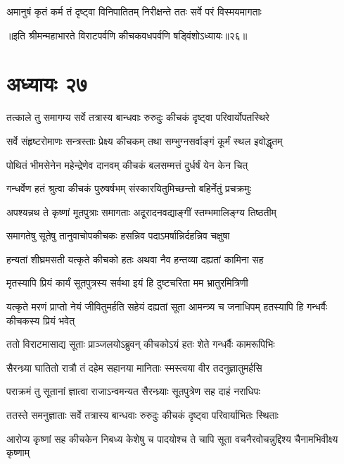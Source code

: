 \twolineshloka
{अमानुषं कृतं कर्म तं दृष्ट्वा विनिपातितम्}
{निरीक्षन्ते ततः सर्वे परं विस्मयमागताः}

॥इति श्रीमन्महाभारते विराटपर्वणि कीचकवधपर्वणि षड्विंशोऽध्यायः॥२६॥

\chapter{अध्यायः २७}

\twolineshloka
{तत्काले तु समागम्य सर्वे तत्रास्य बान्धवाः}
{रुरुदुः कीचकं दृष्ट्वा परिवार्योपतस्थिरे}





\twolineshloka
{सर्वे संहृष्टरोमाणः सन्त्रस्ताः प्रेक्ष्य कीचकम्}
{तथा सम्भुग्नसर्वाङ्गं कूर्मं स्थल इवोद्धृतम्}


\twolineshloka
{पोथितं भीमसेनेन महेन्द्रेणेव दानवम्}
{कीचकं बलसम्मत्तं दुर्धर्षं येन केन चित्}


\twolineshloka
{गन्धर्वेण हतं श्रुत्वा कीचकं पुरुषर्षभम्}
{संस्कारयितुमिच्छन्तो बहिर्नेतुं प्रचक्रमुः}


\twolineshloka
{अपश्यन्नथ ते कृष्णां मूतपुत्राः समागताः}
{अदूरादनवद्याङ्गीं स्तम्भमालिङ्ग्य तिष्ठतीम्}


\twolineshloka
{समागतेषु सूतेषु तानुवाचोपकीचकः}
{हसन्निव पदाऽमर्षान्निर्दहन्निव चक्षुषा}


\twolineshloka
{हन्यतां शीघ्रमसती यत्कृते कीचको हतः}
{अथवा नैव हन्तव्या दह्यतां कामिना सह}


\twolineshloka
{मृतस्यापि प्रियं कार्यं सूतपुत्रस्य सर्वथा}
{इयं हि दुष्टचरिता मम भ्रातुरमित्रिणी}


\threelineshloka
{यत्कृते मरणं प्राप्तो नेयं जीवितुमर्हति}
{सहेयं दह्यतां सूता आमन्त्र्य च जनाधिपम्}
{हतस्यापि हि गन्धर्वैः कीचकस्य प्रियं भवेत्}


\twolineshloka
{ततो विराटमासाद्य सूताः प्राञ्जलयोऽब्रुवन्}
{कीचकोऽयं हतः शेते गन्धर्वैः कामरूपिभिः}


\twolineshloka
{सैरन्ध्र्या घातितो रात्रौ तं दहेम सहानया}
{मानिताः स्मस्त्वया वीर तदनुज्ञातुमर्हसि}


\twolineshloka
{पराक्रमं तु सूतानां ज्ञात्वा राजाऽन्वमन्यत}
{सैरन्ध्र्याः सूतपुत्रेण सह दाहं नराधिपः}


\twolineshloka
{ततस्ते समनुज्ञाताः सर्वे तत्रास्य बान्धवाः}
{रुरुदुः कीचकं दृष्ट्वा परिवार्याभितः स्थिताः}


\twolineshloka
{आरोप्य कृष्णां सह कीचकेन निबध्य केशेषु च पादयोश्च}
{ते चापि सूता वचनैरवोचन्नुद्दिश्य चैनामभिवीक्ष्य कृष्णाम्}


